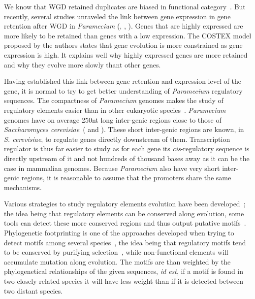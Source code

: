 We know that WGD retained duplicates are biased in functional category~\citep{edger_gene_2009}. But recently, several studies unraveled the link between gene expression in gene retention after WGD in \textit{Paramecium} (\citealt{gout_relationship_2010}, \citealt{arnaiz_gene_2010}, \citealt{chain_odds_2011}). Genes that are highly expressed are more likely to be retained than genes with a low expression. The COSTEX model proposed by the authors states that gene evolution is more constrained as gene expression is high. It explains well why highly expressed genes are more retained and why they evolve more slowly thant other genes.

Having established this link between gene retention and expression level of the gene, it is normal to try to get better understanding of \textit{Paramecium} regulatory sequences. The compactness of \textit{Paramecium} genomes makes the study of regulatory elements easier than in other eukaryotic species~\citep{mcgrath_insights_2014}. \textit{Paramecium} genomes have on average 250nt long inter-genic regions close to those of \textit{Saccharomyces cerevisiae}~(\citealt{chen_minimal_2011} and \citealt{hahn_transcriptional_2011}). These short inter-genic regions are known, in \textit{S. cerevisiae}, to regulate genes directly downstream of them. Transcription regulator is thus far easier to study as for each gene its \textit{cis}-regulatory sequence is directly upstream of it and not hundreds of thousand bases away as it can be the case in mammalian genomes. Because \textit{Paramecium} also have very short inter-genic regions, it is reasonable to assume that the promoters share the same mechanisms.

Various strategies to study regulatory elements evolution have been developed~\citep{wittkopp_cis-regulatory_2012}; the idea being that regulatory elements can be conserved along evolution, some tools can detect these more conserved regions and thus output putative motifs~\citep{dhaeseleer_how_2006}. Phylogenetic footprinting is one of the approaches developed when trying to detect motifs among several species~\citep{zhang_mice_2003}, the idea being that regulatory motifs tend to be conserved by purifying selection~\citep{nelson_conserved_2013}, while non-functional elements will accumulate mutation along evolution. The motifs are than weighted by the phylogenetical relationships of the given sequences, \textit{id est}, if a motif is found in two closely related species it will have less weight than if it is detected between two distant species.


